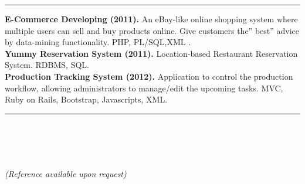 \documentclass[11pt]{article} %
\begin{document}
{\hrule
\smallskip
\noindent\textbf{ E-Commerce Developing (2011).}
{An eBay-like online shopping system where multiple users can sell and buy products online. Give customers the” best” advice by data-mining functionality. PHP, PL/SQL,XML .}\\
\smallskip
\noindent\textbf{ Yummy Reservation System (2011).}
{Location-based Restaurant Reservation System. RDBMS, SQL.}\\
\smallskip
\noindent\textbf{ Production Tracking System (2012).}
{Application to control the production workflow, allowing administrators to manage/edit the upcoming tasks. MVC, Ruby on Rails, Bootstrap, Javascripts, XML. }\\

\smallskip
{}\hrule
\smallskip
{}\\
\\
\\
\\
\smallskip
\noindent\textit{(Reference available upon request)}

}
\end{document}
